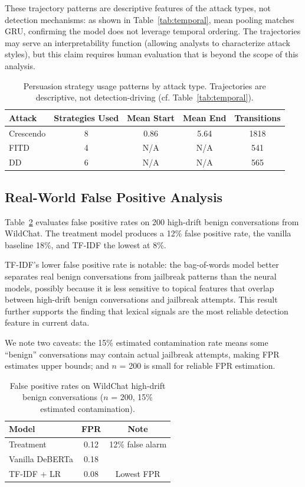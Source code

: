 \documentclass[11pt]{article}
\begin{document}
These trajectory patterns are descriptive features of the attack types, not detection mechanisms: as shown in Table~\ref{tab:temporal}, mean pooling matches GRU, confirming the model does not leverage temporal ordering. The trajectories may serve an interpretability function (allowing analysts to characterize attack styles), but this claim requires human evaluation that is beyond the scope of this analysis.

\begin{table}[t]
\centering
\caption{Persuasion strategy usage patterns by attack type. Trajectories are descriptive, not detection-driving (cf. Table~\ref{tab:temporal}).}
\label{tab:trajectories}
\begin{tabular}{lcccc}
\toprule
\textbf{Attack} & \textbf{Strategies Used} & \textbf{Mean Start} & \textbf{Mean End} & \textbf{Transitions} \\
\midrule
Crescendo & 8 & 0.86 & 5.64 & 1818 \\
FITD & 4 & N/A & N/A & 541 \\
DD & 6 & N/A & N/A & 565 \\
\bottomrule
\end{tabular}
\end{table}

\subsection{Real-World False Positive Analysis}

Table~\ref{tab:wildchat} evaluates false positive rates on 200 high-drift benign conversations from WildChat. The treatment model produces a 12\% false positive rate, the vanilla baseline 18\%, and TF-IDF the lowest at 8\%.

TF-IDF's lower false positive rate is notable: the bag-of-words model better separates real benign conversations from jailbreak patterns than the neural models, possibly because it is less sensitive to topical features that overlap between high-drift benign conversations and jailbreak attempts. This result further supports the finding that lexical signals are the most reliable detection feature in current data.

We note two caveats: the 15\% estimated contamination rate means some ``benign'' conversations may contain actual jailbreak attempts, making FPR estimates upper bounds; and $n$ = 200 is small for reliable FPR estimation.

\begin{table}[t]
\centering
\caption{False positive rates on WildChat high-drift benign conversations ($n$ = 200, 15\% estimated contamination).}
\label{tab:wildchat}
\begin{tabular}{lcc}
\toprule
\textbf{Model} & \textbf{FPR} & \textbf{Note} \\
\midrule
Treatment & 0.12 & 12\% false alarm \\
Vanilla DeBERTa & 0.18 & \\
TF-IDF + LR & 0.08 & Lowest FPR \\
\bottomrule
\end{tabular}
\end{table}
\end{document}
